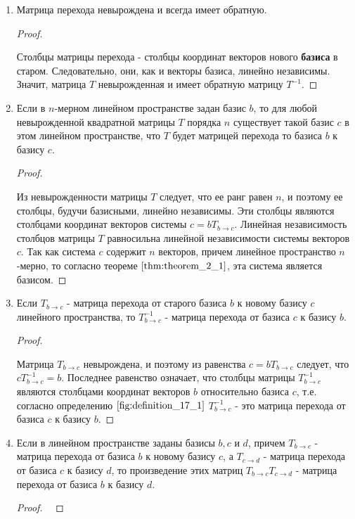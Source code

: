 \begin{enumerate}[label={\arabic*°.}]
    \item Матрица перехода невырождена и всегда имеет обратную.
    \begin{proof}~

        Столбцы матрицы перехода - столбцы координат векторов нового \textbf{базиса} в старом. Следовательно, они, как и векторы базиса, линейно независимы. Значит, матрица $T$ невырожденная и имеет обратную матрицу $T^{-1}$.
    \end{proof}
    
    \item Если в $n$-мерном линейном пространстве задан базис $b$, то для любой невырожденной квадратной матрицы $T$ порядка $n$ существует такой базис $c$ в этом линейном пространстве, что $T$ будет матрицей перехода то базиса $b$ к базису $c$.
    \begin{proof}~

        Из невырожденности матрицы $T$ следует, что ее ранг равен $n$, и поэтому ее столбцы, будучи базисными, линейно независимы. Эти столбцы являются столбцами координат векторов системы $c = bT_{b \to c}$. Линейная независимость столбцов матрицы $T$ равносильна линейной независимости системы векторов $c$. Так как система $c$ содержит $n$ векторов, причем линейное пространство $n$-мерно, то согласно теореме $\eqref{thm:theorem_2_1}$, эта система является базисом.
    \end{proof}
    
    \item Если $T_{b \to c}$ - матрица перехода от старого базиса $b$ к новому базису $c$ линейного пространства, то $T^{-1}_{b \to c}$ - матрица перехода от базиса $c$ к базису $b$.
    \begin{proof}~

        Матрица $T_{b \to c}$ невырождена, и поэтому из равенства $c = bT_{b \to c}$ следует, что $cT^{-1}_{b \to c} = b$. Последнее равенство означает, что столбцы матрицы $T^{-1}_{b \to c}$ являются столбцами координат векторов $b$ относительно базиса $c$, т.е. согласно определению $\eqref{fig:definition_17_1}$ $T^{-1}_{b \to c}$ - это матрица перехода от базиса $c$ к базису $b$.
    \end{proof}

    \item Если в линейном пространстве заданы базисы $b, c$ и $d$, причем $T_{b \to c}$ - матрица перехода от базиса $b$ к новому базису $c$, а $T_{c \to d}$ - матрица перехода от базиса $c$ к базису $d$, то произведение этих матриц $T_{b \to c}T_{c \to d}$ - матрица перехода от базиса $b$ к базису $d$.
    \begin{proof}~


\end{proof}
\end{enumerate}
